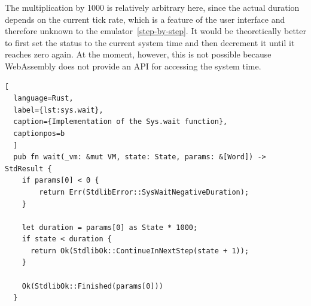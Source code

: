 The multiplication by 1000 is relatively arbitrary here, since the actual duration depends on the current tick rate, which is a feature of the user interface and therefore unknown to the emulator~\ref{step-by-step}.
It would be theoretically better to first set the status to the current system time and then decrement it until it reaches zero again.
At the moment, however, this is not possible because WebAssembly does not provide an API for accessing the system time.
\begin{lstlisting}[
  language=Rust,
  label={lst:sys.wait},
  caption={Implementation of the Sys.wait function},
  captionpos=b
  ]
  pub fn wait(_vm: &mut VM, state: State, params: &[Word]) -> StdResult {
    if params[0] < 0 {
        return Err(StdlibError::SysWaitNegativeDuration);
    }

    let duration = params[0] as State * 1000;
    if state < duration {
      return Ok(StdlibOk::ContinueInNextStep(state + 1));
    }

    Ok(StdlibOk::Finished(params[0]))
  }
\end{lstlisting}

